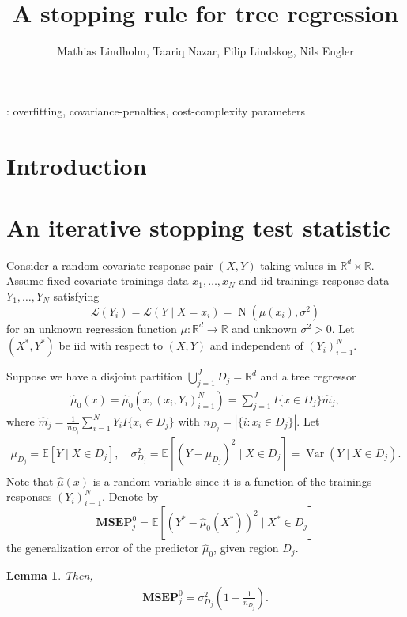 \documentclass[11pt,a4paper]{article}
\title{A stopping rule for tree regression}
\author{Mathias Lindholm, Taariq Nazar, Filip Lindskog, Nils Engler}
\newtheorem{lemma}{Lemma}
\newcommand{\calL}{\mathcal{L}}
\newcommand{\Normal}{\operatorname{N}}
\newcommand{\R}{\mathbb{R}}  %
\newcommand{\E }{\mathbb{E}}  %
\newcommand{\Var}{\operatorname{Var}}  %
\newcommand{\MSEP}{\textbf{MSEP}}
\begin{document}
\maketitle

\begin{abstract}

\end{abstract}

: overfitting, covariance-penalties, cost-complexity parameters

\section{Introduction}

\section{An iterative stopping test statistic}\label{sec:test_stat}

Consider a random covariate-response pair $(X, Y)$ taking values in $\R^{d} \times \R$. Assume fixed covariate trainings data $x_1, \dots, x_N$ and iid trainings-response-data $Y_1, \dots, Y_N $ satisfying 
$$
\calL(Y_i) = \calL\left(Y \mid X = x_i \right)  = \Normal(\mu(x_i), \sigma^2)
$$
for an unknown regression function $\mu \colon \R^d \to \R$ and unknown $\sigma^2 > 0$. Let $(X^*, Y^*)$ be iid with respect to $(X, Y)$ and independent of $(Y_i)_{i=1}^N$.

Suppose we have a disjoint partition $ \bigcup_{j=1}^J D_j = \R^d$ and a tree regressor
\begin{align}\label{eq:mu_hat_0}
\hat \mu_0(x) = \hat \mu_0(x, (x_i, Y_i)_{i=1}^N) = \sum_{j=1}^J I\{x \in D_j\} \hat m_j,
\end{align}
where $\hat m_j = \frac{1}{n_{D_j}} \sum_{i = 1}^{N} Y_i I\{x_i \in D_j\}$ with $n_{D_j} = |\{i \colon x_i \in D_j  \}|$. 
Let
\begin{align*}
\mu_{D_j} = \E[Y \mid X \in D_j ], \quad \sigma^2_{D_j} = \E[(Y-\mu_{D_j})^2 \mid X \in D_j]
= \Var(Y \mid X \in D_j).
 \end{align*}
 Note that $\hat \mu(x)$ is a random variable since it is a function of the trainings-responses $(Y_i)_{i=1}^N$. Denote by 
 $$
 \MSEP^0_j = \E \left[
\left(Y^* - \hat \mu_0(X^*)\right)^2 \mid X^* \in D_j
 \right] 
 $$ 
 the generalization error of the predictor $\hat \mu_0$, given region $D_j$.
\begin{lemma}\label{lem:mot1}
Then,
\begin{align*}
\MSEP^0_j =  \sigma_{D_j}^2\left(1 + \frac{1}{n_{D_j}}\right). 
\end{align*}
\end{lemma}
\end{document}
